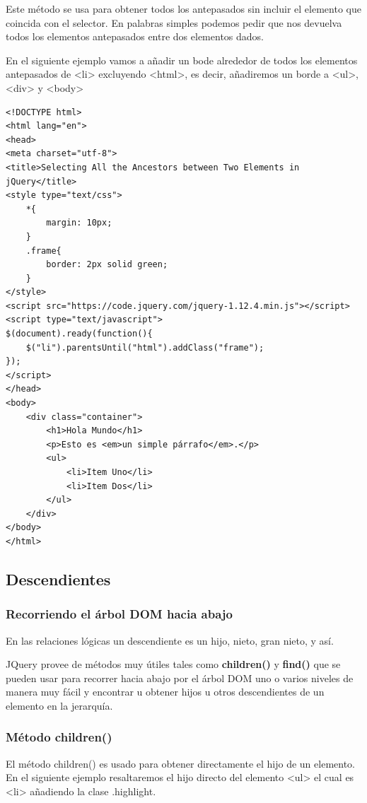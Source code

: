 \documentclass[11pt]{article}
\begin{document}
Este método se usa para obtener todos los antepasados sin incluir el elemento que coincida con el selector. En palabras simples podemos pedir que nos devuelva todos los elementos antepasados entre dos elementos dados.

En el siguiente ejemplo vamos a añadir un bode alrededor de todos los elementos antepasados de <li> excluyendo <html>, es decir, añadiremos un borde a <ul>, <div> y <body>

\begin{verbatim}
<!DOCTYPE html>
<html lang="en">
<head>
<meta charset="utf-8">
<title>Selecting All the Ancestors between Two Elements in jQuery</title>
<style type="text/css">
    *{
        margin: 10px;
    }
    .frame{
        border: 2px solid green;
    }        
</style>
<script src="https://code.jquery.com/jquery-1.12.4.min.js"></script>
<script type="text/javascript">
$(document).ready(function(){
    $("li").parentsUntil("html").addClass("frame");
});
</script>
</head>
<body>
    <div class="container">
        <h1>Hola Mundo</h1>
        <p>Esto es <em>un simple párrafo</em>.</p>
        <ul>
            <li>Item Uno</li>
            <li>Item Dos</li>
        </ul>
    </div>
</body>
</html>                                		
\end{verbatim}

\subsection*{Descendientes}
\label{sec:orga703229}

\subsubsection*{Recorriendo el árbol DOM hacia abajo}
\label{sec:orga89f13d}

En las relaciones lógicas un descendiente es un hijo, nieto, gran nieto, y así.

JQuery provee de métodos muy útiles tales como \textbf{children()} y \textbf{find()} que se pueden usar para recorrer hacia abajo por el árbol DOM uno o varios niveles de manera muy fácil y encontrar u obtener hijos u otros descendientes de un elemento en la jerarquía.

\subsubsection*{Método children()}
\label{sec:org78c2a58}

El método children() es usado para obtener directamente el hijo de un elemento. En el siguiente ejemplo resaltaremos el hijo directo del elemento <ul> el cual es <li> añadiendo la clase .highlight. 
\end{document}
